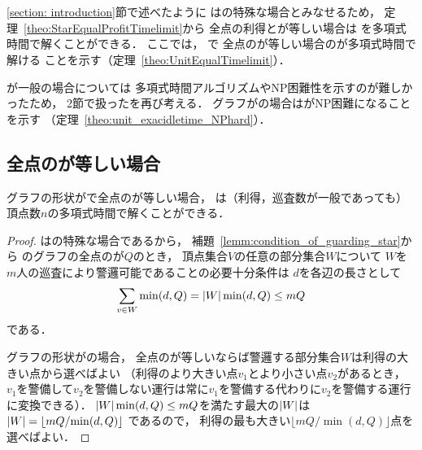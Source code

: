 \section{{\graphUnit}}
\label{section: unit}

\ref{section: introduction}節で述べたように
{\graphUnit}は{\graphStar}の特殊な場合とみなせるため，
定理~\ref{theo:StarEqualProfitTimelimit}から
全点の利得と{\maxIdletime}が等しい場合は
{\patProb}を多項式時間で解くことができる．
ここでは，
{\graphUnit}で
全点の{\maxIdletime}が等しい場合の{\patProb}が多項式時間で解ける
ことを示す（定理~\ref{theo:UnitEqualTimelimit}）．

{\maxIdletime}が一般の場合については
多項式時間アルゴリズムやNP困難性を示すのが難しかったため，
2節で扱った{\timeSpecifiedPatProb}を再び考える．
グラフが{\graphUnit}の場合は{\timeSpecifiedPatProb}がNP困難になることを示す
（定理~\ref{theo:unit_exacidletime_NPhard}）．



\subsection{全点の{\maxIdletime}が等しい場合}

\begin{theo}
\label{theo:UnitEqualTimelimit}
グラフの形状が{\graphUnit}で全点の{\maxIdletime}が等しい場合，
{\patProb}は（利得，巡査数が一般であっても）
頂点数$n$の多項式時間で解くことができる．
\end{theo}

\begin{proof}
{\graphUnit}は{\graphStar}の特殊な場合であるから，
補題~\ref{lemm:condition_of_guarding_star}から
{\graphUnit}のグラフの全点の{\maxIdletime}が$Q$のとき，
頂点集合$V$の任意の部分集合$W$について
$W$を$m$人の巡査により警邏可能であることの必要十分条件は
$d$を各辺の長さとして
\[
  \sum_{v \in W} \min(d, Q) = \lvert{W}\rvert\min(d, Q) \leq mQ
\]
である．

グラフの形状が{\graphUnit}の場合，
全点の{\maxIdletime}が等しいならば警邏する部分集合$W$は利得の大きい点から選べばよい
（利得のより大きい点$v_1$とより小さい点$v_2$があるとき，
$v_1$を警備して$v_2$を警備しない運行は常に$v_1$を警備する代わりに$v_2$を警備する運行に変換できる）．
$\lvert{W}\rvert\min(d, Q) \leq mQ$を満たす最大の$\lvert{W}\rvert$は
$\lvert{W}\rvert = \left\lfloor {mQ}/{\min(d, Q)} \right\rfloor$
であるので，
利得の最も大きい$\lfloor {mQ}/{\min(d, Q)} \rfloor$点を選べばよい．
\end{proof}




